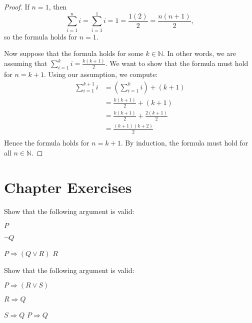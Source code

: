 \begin{proof}
If $n=1$, then \[ \sum_{i=1}^n i=\sum_{i=1}^1 i=1=\frac{1(2)}2=
\frac{n(n+1)}2, \] so the formula holds for $n=1$.

Now suppose that the formula holds for some $k\in\mathbb N$.  In other
words, we are assuming that $\sum_{i=1}^k i=\frac{k(k+1)}2$.  We
want to show that the formula must hold for $n=k+1$.  Using our
assumption, we compute:
\begin{equation*}
\begin{split}
\sum_{i=1}^{k+1} i &= \left(\sum_{i=1}^k i\right) +(k+1)\\
&= \frac{k(k+1)}2+(k+1)\\
&= \frac{k(k+1)}2+\frac{2(k+1)}2\\
&=\frac{(k+1)(k+2)}2\\
\end{split}
\end{equation*}
Hence the formula holds for $n=k+1$.  By induction, the formula must
hold for all $n\in\mathbb N$.
\end{proof}

\clearpage

\section*{Chapter  Exercises}

\begin{exercise}\label{exer:arg}
Show that the following argument is valid:
{\setlength\linwid{1in}
\begin{centeredarg}
\item $P$
\item $\neg Q$
\item $P\Rightarrow(Q\lor R)$
\hence $R$
\end{centeredarg}}
\end{exercise}

\begin{exercise}\label{exer:cases}
Show that the following argument is valid:
\begin{centeredarg}
\item $P\Rightarrow(R\lor S)$
\item $R\Rightarrow Q$
\item $S\Rightarrow Q$
\hence $P\Rightarrow Q$
\end{centeredarg}
\end{exercise}

